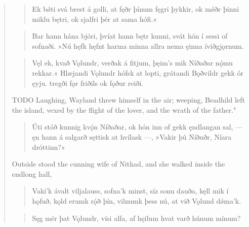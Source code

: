 \begin{verse}

\begin{verse}
\bva Ek bǿti svá \hld brest á golli,
at fęðr þínum \hld fęgri þykkir,
ok mǿðr þinni \hld miklu bętri,
ok sjalfri þér \hld at sama hófi.«  \\%
\end{verse}


\begin{verse}
\bva Bar hann hána bjóri, \hld þvíat hann bętr kunni,
svát hón í sessi \hld of sofnaði.
»Nú hęfk hęfnt \hld harma minna
allra nema ęinna \hld íviðgjǫrnum. \\%
\end{verse}


\begin{verse}
\bva Vęl ek, kvað Vǫlundr, \hld verðak á fitjum,
þęim's mik Níðaðar \hld nǫ́mu rekkar.« 
Hlæjandi Vǫlundr \hld hófsk at lopti,
grátandi Bǫðvildr \hld gekk ór ęyju.
tregði fǫr friðils \hld ok fǫður reiði. \\%
\end{verse}

\bvb TODO Laughing, Wayland threw himself in the air; weeping, Beadhild left the island, vexed by the flight of the lover, and the wrath of the father."

\begin{verse}
\bva Úti stóð kunnig \hld kvǫ́n Níðaðar,
ok hón inn of gekk \hld ęndlangan sal,
— ęn hann á salgarð \hld sęttisk at hvílask —,
»Vakir þú Níðuðr, \hld Níara dróttinn?«  \\%
\end{verse}

\bvb Outside stood the cunning wife of Nithad, and she walked inside the endlong hall,

\begin{verse}
\bva Vaki'k ávalt \hld viljalauss,
sofna'k minst, \hld síz sonu dauða,
kęll mik í hǫfuð, \hld kǫld erumk rǫ́ð þín,
vilnumk þess nú, \hld at við Vǫlund dǿma'k. \\%
\end{verse}


\begin{verse}
\bva Sęg mér þat Vǫlundr, \hld vísi alfa,
af hęilum hvat varð \hld húnum mínum? \\%
\end{verse}



\end{verse}
